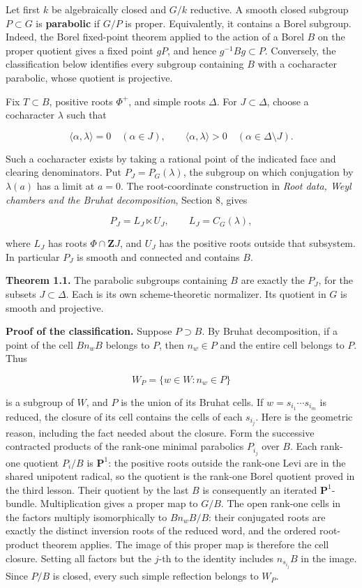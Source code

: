 \documentclass[11pt,a4paper,openany]{report}
\begin{document}
Let first \(k\) be algebraically closed and \(G/k\) reductive. A smooth closed subgroup \(P\subset G\) is \textbf{parabolic} if \(G/P\) is proper. Equivalently, it contains a Borel subgroup. Indeed, the Borel fixed-point theorem applied to the action of a Borel \(B\) on the proper quotient gives a fixed point \(gP\), and hence \(g^{-1}Bg\subset P\). Conversely, the classification below identifies every subgroup containing \(B\) with a cocharacter parabolic, whose quotient is projective.

Fix \(T\subset B\), positive roots \(\Phi^+\), and simple roots \(\Delta\). For \(J\subset\Delta\), choose a cocharacter \(\lambda\) such that

\[
\langle\alpha,\lambda\rangle=0\quad(\alpha\in J),\qquad
\langle\alpha,\lambda\rangle>0\quad(\alpha\in\Delta\setminus J).
\]

Such a cocharacter exists by taking a rational point of the indicated face and clearing denominators. Put \(P_J=P_G(\lambda)\), the subgroup on which conjugation by \(\lambda(a)\) has a limit at \(a=0\). The root-coordinate construction in \emph{Root data, Weyl chambers and the Bruhat decomposition}, Section 8, gives

\[
P_J=L_J\ltimes U_J,
\qquad L_J=C_G(\lambda),
\tag{1.1}
\]

where \(L_J\) has roots \(\Phi\cap\mathbf ZJ\), and \(U_J\) has the positive roots outside that subsystem. In particular \(P_J\) is smooth and connected and contains \(B\).

\textbf{Theorem 1.1.} The parabolic subgroups containing \(B\) are exactly the \(P_J\), for the subsets \(J\subset\Delta\). Each is its own scheme-theoretic normalizer. Its quotient in \(G\) is smooth and projective.

\textbf{Proof of the classification.} Suppose \(P\supset B\). By Bruhat decomposition, if a point of the cell \(Bn_wB\) belongs to \(P\), then \(n_w\in P\) and the entire cell belongs to \(P\). Thus

\[
W_P=\{w\in W:n_w\in P\}
\]

is a subgroup of \(W\), and \(P\) is the union of its Bruhat cells. If \(w=s_{i_1}\cdots s_{i_m}\) is reduced, the closure of its cell contains the cells of each \(s_{i_j}\). Here is the geometric reason, including the fact needed about the closure. Form the successive contracted products of the rank-one minimal parabolics \(P_{i_j}\) over \(B\). Each rank-one quotient \(P_i/B\) is \(\mathbf P^1\): the positive roots outside the rank-one Levi are in the shared unipotent radical, so the quotient is the rank-one Borel quotient proved in the third lesson. Their quotient by the last \(B\) is consequently an iterated \(\mathbf P^1\)-bundle. Multiplication gives a proper map to \(G/B\). The open rank-one cells in the factors multiply isomorphically to \(Bn_wB/B\): their conjugated roots are exactly the distinct inversion roots of the reduced word, and the ordered root-product theorem applies. The image of this proper map is therefore the cell closure. Setting all factors but the \(j\)-th to the identity includes \(n_{s_{i_j}}B\) in the image. Since \(P/B\) is closed, every such simple reflection belongs to \(W_P\).
\end{document}
